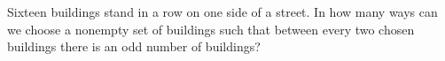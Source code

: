 Sixteen buildings stand in a row on one side of a street. In how many ways can we choose a nonempty set of buildings such that between every two chosen buildings there is an odd number of buildings?
